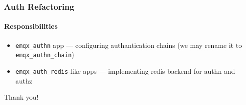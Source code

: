 \documentclass{beamer}
\begin{document}
\begin{frame}
    \frametitle{Auth Refactoring}
    \framesubtitle{Responsibilities}

    \begin{center}
        \begin{itemize}
            \item \lstinline{emqx_authn} app — configuring authantication chains (we may rename it to \lstinline{emqx_authn_chain})
            \item \lstinline{emqx_auth_redis}-like apps — implementing redis backend for authn and authz
        \end{itemize}
    \end{center}
\end{frame}

\begin{frame}
    \begin{center}
        Thank you!
    \end{center}
\end{frame}
\end{document}
